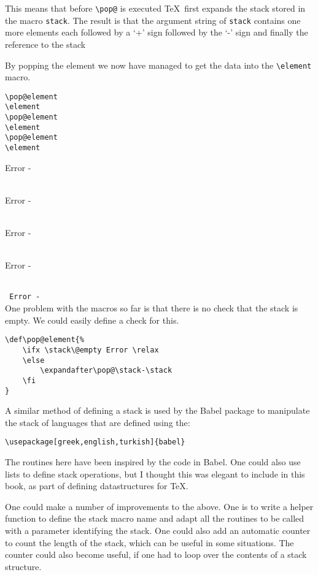 \def\pop@element{%
\ifx \stack\@empty  Error\relax \else
\expandafter\pop@\stack-\stack
\fi
}
This means that before \verb+\pop@+ is executed \TeX\ first expands the stack stored in the macro \verb+stack+. The result is that the argument string of \verb+stack+ contains one more elements each followed by a `+' sign followed by the `-' sign and finally the reference to the stack

By popping the element we now have managed to get the data into the \verb+\element+ macro.

\begin{verbatim}
\pop@element
\element
\pop@element
\element
\pop@element
\element
\end{verbatim}
\pop@element
\noindent\texttt{\element}\\
\pop@element
\noindent\texttt{\element}\\
\pop@element
\noindent\texttt{\element}\\
\pop@element
\noindent\texttt{\element}\\
\noindent\texttt{\pop@element}\\

One problem with the macros so far is that there is no check that the stack is empty. We could easily define a check for this.

\begin{verbatim}
\def\pop@element{%
    \ifx \stack\@empty Error \relax 
    \else
        \expandafter\pop@\stack-\stack
    \fi
}
\end{verbatim}


A similar method of defining a stack is used by the Babel package to manipulate the stack of languages that are defined using the:

\begin{verbatim}
\usepackage[greek,english,turkish]{babel}
\end{verbatim}

The routines here have been inspired by the code in Babel. One could also use lists to define stack operations, but I thought this was elegant to include in this book, as part of defining datastructures for \TeX.

One could make a number of improvements to the above. One is to write a helper function to define the stack macro name and adapt all the routines to be called with a parameter identifying the stack. One could also add an automatic counter to count the length of the stack, which can be useful in some situations. The counter could also become useful, if one had to loop over the contents of a stack structure.

